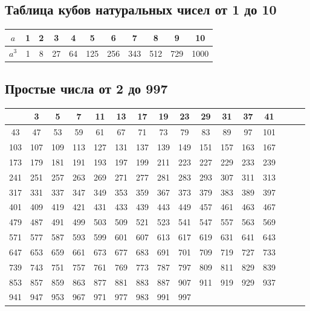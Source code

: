 \documentclass[a4paper, 14pt]{extarticle}
\begin{document}
{\subsection{Таблица кубов натуральных чисел от 1 до 10}

\begin{center}
{\setlength{\extrarowheight}{3pt}
\begin{tabular}{|c|c|c|c|c|c|c|c|c|c|c|}
\hline 
$a$     & 1 & 2 & 3   &  4 & 5 & 6 & 7 & 8 & 9 &10\\ 
\hline 
$a^3$ &1 & 8 & 27 & 64 & 125 & 256 & 343 & 512 & 729 & 1000 \\ 
\hline 
\end{tabular} 
}
\end{center}


\subsection{Простые числа от 2 до 997}

{\small
\begin{center}
{\setlength{\extrarowheight}{3pt}
\begin{tabular}{|c|c|c|c|c|c|c|c|c|c|c|c|c|c|c|c|}
\hline 
\rowcolor{Gray}
\hline 
2  & 3 & 5 & 7 & 11 & 13 & 17 & 19 & 23 & 29 & 31 & 37 & 41\\ 
\hline 
43 & 47 & 53 & 59 & 61 & 67 & 71 & 73 & 79 & 83 & 89 & 97 & 101  \\
\hline 
\rowcolor{Gray}
103 &107 & 109 & 113  & 127 & 131 & 137 & 139 & 149 & 151 & 157 & 163 & 167\\ 
\hline 
173 & 179 & 181 & 191 & 193 & 197 & 199 & 211 & 223 & 227 & 229 & 233 & 239 \\
\hline 
\rowcolor{Gray}
241 & 251 & 257 & 263  & 269 & 271 & 277 & 281 & 283 & 293 & 307 & 311 & 313\\ 
\hline 
317 & 331 & 337 & 347 & 349 & 353 & 359 & 367 & 373 & 379 & 383 & 389 & 397 \\
\hline 
\rowcolor{Gray}
401 & 409 & 419 & 421  & 431 & 433 & 439 & 443 & 449 & 457 & 461 & 463 & 467\\ 
\hline 
479 & 487 & 491 & 499 & 503 & 509 & 521 & 523 & 541 & 547 & 557 & 563 & 569 \\
\hline 
\rowcolor{Gray}
571 & 577 & 587 & 593  & 599 & 601 & 607 & 613 & 617 & 619 & 631 & 641 & 643\\
 \hline 
647 & 653 & 659 & 661 & 673 & 677 & 683 & 691 & 701 & 709 & 719 & 727 & 733 \\
\hline 
\rowcolor{Gray}
739 & 743 & 751 & 757  & 761 & 769 & 773 & 787 & 797 & 809 & 811 & 829 & 839\\
 \hline 
853 & 857 & 859 & 863 & 877 & 881 & 883 & 887 & 907 & 911 & 919 & 929 & 937 \\
\hline 
\rowcolor{Gray}
941 & 947 & 953 & 967  & 971 & 977 & 983 & 991 & 997 &  &  &  & \\
\hline
\end{tabular} 
}
\end{center}
}

}
\end{document}

